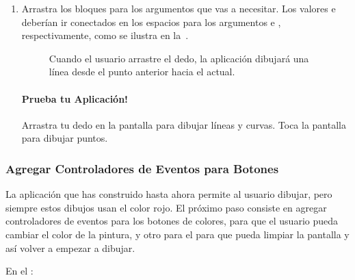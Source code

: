 \begin{enumerate}
\item Arrastra los bloques  para los argumentos que vas a
  necesitar. Los valores  e 
  deberían ir conectados en los espacios para los
  argumentos  e , respectivamente, como se
  ilustra en la~.

\begin{figure}[H]
\centering
\caption{Cuando el usuario arrastre el dedo, la aplicación dibujará
  una línea desde el punto anterior hacia el actual.}
\label{fig:PaintPot12}
\end{figure}

\paragraph{Prueba tu Aplicación!} Arrastra tu dedo en la pantalla para
dibujar líneas y curvas. Toca la pantalla para dibujar puntos.

\end{enumerate}

\subsubsection*{Agregar Controladores de Eventos para Botones}

La aplicación que has construido hasta ahora permite al usuario
dibujar, pero siempre estos dibujos usan el color rojo. El próximo
paso consiste en agregar controladores de eventos para los botones de
colores, para que el usuario pueda cambiar el color de la pintura, y
otro para el  para que pueda limpiar la
pantalla y así volver a empezar a dibujar.

En el \blockEditor:

